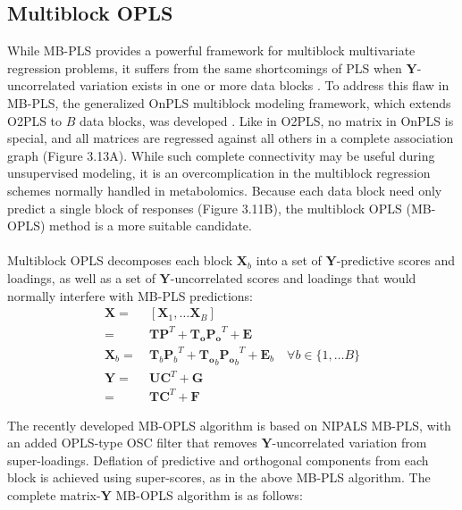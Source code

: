 \subsection{Multiblock OPLS}

\begin{doublespace}
While MB-PLS provides a powerful framework for multiblock multivariate
regression problems, it suffers from the same shortcomings of PLS when
$\mathbf{Y}$-uncorrelated variation exists in one or more data blocks
\cite{lofstedt:jchemo2011,lofstedt2012}. To address this flaw in MB-PLS,
the generalized OnPLS multiblock modeling framework, which extends O2PLS to
$B$ data blocks, was developed \cite{lofstedt2012}. Like in O2PLS, no matrix
in OnPLS is special, and all matrices are regressed against all others in a
complete association graph (Figure 3.13A). While such complete connectivity
may be useful during unsupervised modeling, it is an overcomplication in
the multiblock regression schemes normally handled in metabolomics. Because
each data block need only predict a single block of responses (Figure 3.11B),
the multiblock OPLS (MB-OPLS) method is a more suitable candidate.
\\\\
Multiblock OPLS decomposes each block $\mathbf{X}_b$ into a set of
$\mathbf{Y}$-predictive scores and loadings, as well as a set of
$\mathbf{Y}$-uncorrelated scores and loadings that would normally
interfere with MB-PLS predictions:
\begin{align}
\mathbf{X} =& \: [\mathbf{X}_1, \dots \mathbf{X}_B] \\
           =& \: \mathbf{T} \mathbf{P}^T +
                 \mathbf{T_o} \mathbf{P_o}^T + \mathbf{E} \\
\mathbf{X}_b =& \: \mathbf{T}_b {\mathbf{P}_b}^T +
                   \mathbf{T_o}_b {\mathbf{P_o}_b}^T + \mathbf{E}_b
 \quad \forall b \in \{1, \dots B\} \\
\mathbf{Y} =& \: \mathbf{U} \mathbf{C}^T + \mathbf{G} \\
           =& \: \mathbf{T} \mathbf{C}^T + \mathbf{F} \nonumber
\end{align}

The recently developed MB-OPLS algorithm is based on NIPALS MB-PLS, with an
added OPLS-type OSC filter that removes $\mathbf{Y}$-uncorrelated variation
from super-loadings. Deflation of predictive and orthogonal components from
each block is achieved using super-scores, as in the above MB-PLS algorithm.
The complete matrix-$\mathbf{Y}$ MB-OPLS algorithm is as follows:
\end{doublespace}

